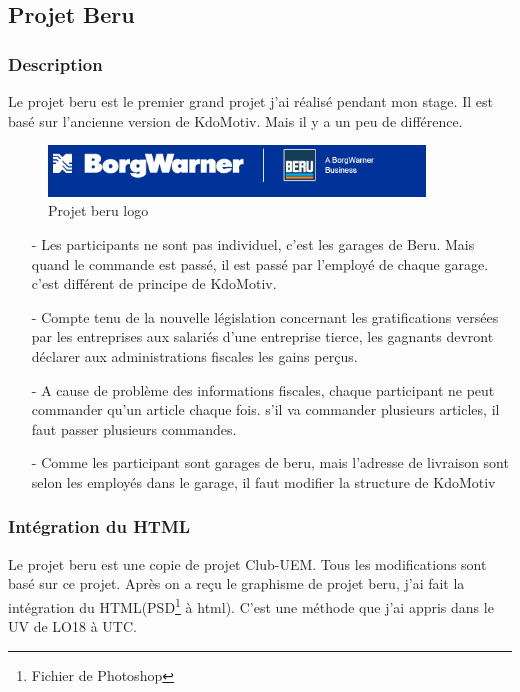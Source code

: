\subsection{Projet Beru}

\subsubsection{Description}
Le projet beru est le premier grand projet j'ai réalisé pendant mon stage. Il est basé sur l'ancienne version de KdoMotiv. Mais il y a un peu de différence.

\begin{figure}[hbtp]
\center
\includegraphics[width=10cm]{body/images/projet-beru.png}
\caption{Projet beru logo}
\end{figure}

\begin{itemize}
\item [-] Les participants ne sont pas individuel, c'est les garages de Beru. Mais quand le commande est passé, il est passé par l'employé de chaque garage. c'est différent de principe de KdoMotiv.
\item [-] Compte tenu de la nouvelle législation concernant les gratifications versées par les entreprises aux salariés d'une entreprise tierce, les gagnants devront déclarer aux administrations fiscales les gains perçus. 
\item [-] A cause de problème des informations fiscales, chaque participant ne peut commander qu'un article chaque fois. s'il va commander plusieurs articles, il faut passer plusieurs commandes.
\item [-] Comme les participant sont garages de beru, mais l'adresse de livraison sont selon les employés dans le garage, il faut modifier la structure de KdoMotiv 
\end{itemize}

\subsubsection{Intégration du HTML}
Le projet beru est une copie de projet Club-UEM. Tous les modifications sont basé sur ce projet. Après on a reçu le graphisme de projet beru, j'ai fait la intégration du HTML(PSD\footnote{Fichier de Photoshop} à html). C'est une  méthode que j'ai appris dans le UV de LO18 à UTC.  

